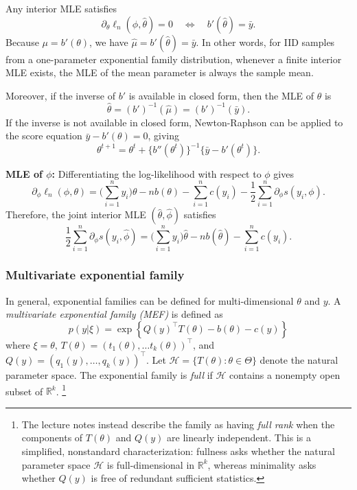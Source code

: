 \documentclass{article}
\theoremstyle{break}
\newcommand{\R}{\ensuremath{\mathbb{R}}}
\begin{document}
Any interior MLE satisfies
\[
    \partial_\theta\ell_n(\hat\phi,\hat\theta)=0
    \quad\Leftrightarrow\quad
    b'(\hat\theta)=\bar y.
\]
Because $\mu=b'(\theta)$, we have $\hat\mu=b'(\hat\theta)=\bar y$. 
In other words, for IID samples from a one-parameter exponential family distribution, whenever a finite interior MLE exists, the MLE of the mean parameter is always the sample mean.

Moreover, if the inverse of $b'$ is available in closed form, then the MLE of $\theta$ is
\[
    \hat\theta=(b')^{-1}(\hat\mu)=(b')^{-1}(\bar y).
\]
If the inverse is not available in closed form, Newton-Raphson can be applied to the score equation $\bar y-b'(\theta)=0$, giving
\[
    \theta^{t+1}
    =
    \theta^t
    +\{b''(\theta^t)\}^{-1}
    \{\bar y-b'(\theta^t)\}.
\]

\textbf{MLE of $\phi$:} Differentiating the log-likelihood with respect to $\phi$ gives
\[
    \partial_\phi\ell_n(\phi,\theta)
    =
    \big(\sum_{i=1}^n y_i \big) \theta
    -nb(\theta)
    -\sum_{i=1}^n c(y_i)
    -\frac{1}{2}\sum_{i=1}^n\partial_\phi s(y_i,\phi).
\]
Therefore, the joint interior MLE $(\hat\theta,\hat\phi)$ satisfies
\[
    \frac{1}{2}\sum_{i=1}^n\partial_\phi s(y_i,\hat\phi)
    =
    \big(\sum_{i=1}^n y_i \big) \hat\theta
    -nb(\hat\theta)
    -\sum_{i=1}^n c(y_i).
\]

\subsubsection{Multivariate exponential family}
In general, exponential families can be defined for multi-dimensional $\theta$ and $y$. A \emph{multivariate exponential family (MEF)} is defined as
\begin{equation*}
  p(y | \xi) = \exp 
  \left\{
    Q(y)^\top T(\theta) - b(\theta) - c(y)
  \right\}
\end{equation*}
where $\xi = \theta$, $T(\theta) = (t_1(\theta), \ldots t_k(\theta))^\top$, and 
$Q(y) = (q_1(y), \ldots, q_k(y))^\top$. 
Let $\mathcal{H}=\{T(\theta):\theta\in\Theta\}$ denote the natural parameter space. The exponential family is \emph{full} if $\mathcal{H}$ contains a nonempty open subset of $\R^k$.
\footnote{The lecture notes instead describe the family as having \emph{full rank} when the components of $T(\theta)$ and $Q(y)$ are linearly independent. This is a simplified, nonstandard characterization: fullness asks whether the natural parameter space $\mathcal{H}$ is full-dimensional in $\R^k$, whereas minimality asks whether $Q(y)$ is free of redundant sufficient statistics.}
\end{document}
